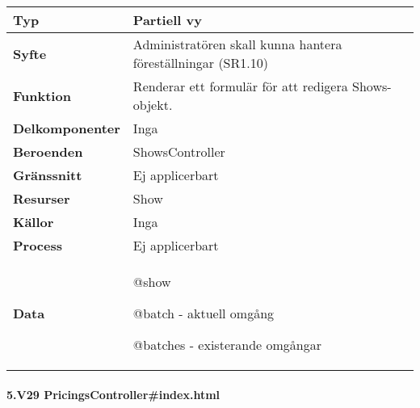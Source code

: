 \documentclass[a4paper, twoside, 11pt, titlepage]{article}
\begin{document}
			\begin {table} [ht] \begin{tabular} {  p{3.5cm} p{11.6cm} }
				\hline
				{\sffamily\textbf{Typ}} & {Partiell vy} \\
				\hline
				{\sffamily\textbf{Syfte}} & {Administratören skall kunna hantera föreställningar (SR1.10)} \\
				\hline
				{\sffamily\textbf{Funktion}} & {Renderar ett formulär för att redigera Shows-objekt.} \\
				\hline
				{\sffamily\textbf{Delkomponenter}} & {Inga} \\
				\hline
				{\sffamily\textbf{Beroenden}} & {ShowsController} \\
				\hline
				{\sffamily\textbf{Gränssnitt}} & {Ej applicerbart} \\
				\hline
				{\sffamily\textbf{Resurser}} & {Show} \\
				\hline
				{\sffamily\textbf{Källor}} & {Inga} \\
				\hline
				{\sffamily\textbf{Process}} & {Ej applicerbart} \\
				\hline
				{\sffamily\textbf{Data}} & {@show

@batch - aktuell omgång

@batches - existerande omgångar} \\
				\hline
			\end{tabular} \end{table} \FloatBarrier


			\paragraph{5.V29 PricingsController\#index.html}\
\end{document}
